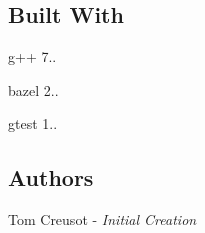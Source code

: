 \subsection*{Built With}


\begin{DoxyItemize}
\item g++ 7..
\item bazel 2..
\item gtest 1..
\end{DoxyItemize}

\subsection*{Authors}


\begin{DoxyItemize}
\item Tom Creusot -\/ {\itshape Initial Creation} 
\end{DoxyItemize}
